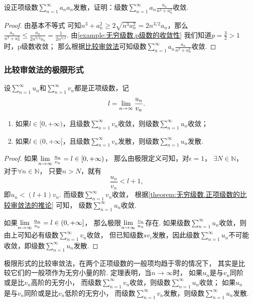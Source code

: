 \begin{example}
\def\s{\sum\limits_{n=1}^\infty a_n}%
设正项级数\(\s a_n\)发散，证明：级数\(\s \frac{a_n}{n^3+a_n^2}\)收敛.
\begin{proof}
由基本不等式  可知\(n^3+a_n^2\geq2\sqrt{n^3 a_n^2}=2n^{3/2}a_n\)，那么\(\frac{a_n}{n^3+a_n^2}\leq\frac{a_n}{2n^{3/2}a_n}=\frac{1}{2n^{3/2}}\).
由\cref{example:无穷级数.p级数的收敛性} 我们知道\(p=\frac{3}{2}>1\)时，p级数收敛；
那么根据\hyperref[theorem:无穷级数.正项级数的比较审敛法]{比较审敛法}可知级数\(\s \frac{a_n}{n^3+a_n^2}\)收敛.
\end{proof}
\end{example}

\subsubsection{比较审敛法的极限形式}
\begin{theorem}[比较审敛法的极限形式]\label{theorem:无穷级数.正项级数的比较审敛法的极限形式}
设\(\sum\limits_{n=1}^\infty u_n\)和\(\sum\limits_{n=1}^\infty v_n\)都是正项级数，记\[
l = \lim\limits_{n\to\infty} \frac{u_n}{v_n}.
\]\begin{enumerate}
\item 如果\(l\in[0,+\infty)\)，且级数\(\sum\limits_{n=1}^\infty v_n\)收敛，则级数\(\sum\limits_{n=1}^\infty u_n\)收敛；
\item 如果\(l\in(0,+\infty]\)，且级数\(\sum\limits_{n=1}^\infty v_n\)发散，则级数\(\sum\limits_{n=1}^\infty u_n\)发散.
\end{enumerate}
\begin{proof}
如果\(\lim\limits_{n\to\infty} {\frac{u_n}{v_n}}=l\in[0,+\infty)\)，
那么由极限定义可知，对\(\epsilon=1\)，
\(\exists N\in\mathbb{N}\)，
对于\(\forall n\in\mathbb{N}\)，
只要\(n>N\)，就有\[
	\frac{u_n}{v_n} < l+1,
\]
即\(u_n < (l+1) v_n\).
而级数\(\sum\limits_{n=1}^\infty v_n\)收敛，
根据\cref{theorem:无穷级数.正项级数的比较审敛法的推论} 可知，
级数\(\sum\limits_{n=1}^\infty u_n\)收敛.

如果\(\lim\limits_{n\to\infty} {\frac{u_n}{v_n}}=l\in(0,+\infty]\)，
那么极限\(\lim\limits_{n\to\infty} \frac{v_n}{u_n}\)存在.
如果级数\(\sum\limits_{n=1}^\infty u_n\)收敛，则由上可知必有级数\(\sum\limits_{n=1}^\infty v_n\)收敛，
但已知级数\(s v_i\)发散，因此级数\(\sum\limits_{n=1}^\infty u_n\)不可能收敛，即级数\(\sum\limits_{n=1}^\infty u_n\)发散.
\end{proof}
\end{theorem}

极限形式的比较审敛法，在两个正项级数的一般项均趋于零的情况下，
其实是比较它们的一般项作为无穷小量的阶.
定理表明，当\(n \to \infty\)时，
如果\(u_n\)是与\(v_n\)同阶或是比\(v_n\)高阶的无穷小，
而级数\(\sum\limits_{n=1}^\infty v_n\)收敛，则级数\(\sum\limits_{n=1}^\infty u_n\)收敛；
如果\(u_n\)是与\(v_n\)同阶或是比\(v_n\)低阶的无穷小，
而级数\(\sum\limits_{n=1}^\infty v_n\)发散，则级数\(\sum\limits_{n=1}^\infty u_n\)发散.

